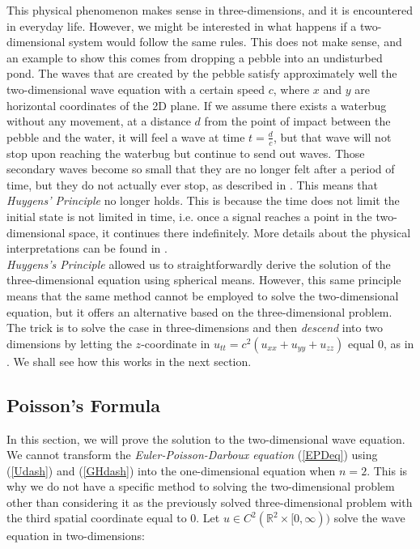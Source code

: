 \documentclass[a4paper, 12pt]{article}
\numberwithin{equation}{section}
\begin{document}
This physical phenomenon makes sense in three-dimensions, and it is encountered
in everyday life. However, we might be interested in what happens if a
two-dimensional system would follow the same rules. This does not make sense,
and an example to show this comes from dropping a pebble into an undisturbed
pond. The waves that are created by the pebble satisfy approximately well the
two-dimensional wave equation with a certain speed $c$, where $x$ and $y$ are
horizontal coordinates of the 2D plane. If we assume there exists a waterbug
without any movement, at a distance $d$ from the point of impact between the
pebble and the water, it will feel a wave at time $t=\frac{d}{c}$, but that wave
will not stop upon reaching the waterbug but continue to send out waves. Those
secondary waves become so small that they are no longer felt after a period of
time, but they do not actually ever stop, as described in \cite[Ch. 9.2]{Str}. This means
that \emph{Huygens' Principle} no longer holds. This is because the time does
not limit the initial state is not limited in time, i.e. once a signal reaches a
point in the two-dimensional space, it continues there indefinitely. More
details about the physical interpretations can be found in \cite[Ch.
III, \S 4.6]{Hil}. \\

\emph{Huygens's Principle} allowed us to straightforwardly derive the solution
of the three-dimensional equation using spherical means. However, this same
principle means that the same method cannot be employed to solve the
two-dimensional equation, but it offers an alternative based on the
three-dimensional problem. The trick is to solve the case in three-dimensions
and then \emph{descend} into two dimensions by letting the $z$-coordinate in
$u_{tt}=c^2(u_{xx}+u_{yy}+u_{zz})$ equal $0$, as in \cite[Ch. 2.4.1.c]{Ev}. We shall see how
this works in the next section. 

\subsection{Poisson's Formula}

In this section, we will prove the solution to the two-dimensional wave
equation. We cannot transform the \emph{Euler-Poisson-Darboux equation}
(\ref{EPDeq}) using (\ref{Udash}) and (\ref{GHdash}) into the one-dimensional
equation when $n=2$. This is why we do not have a specific method to solving the
two-dimensional problem other than considering it as the previously solved
three-dimensional problem with the third spatial coordinate equal to $0$. Let $u
\in C^2(\mathbb{R}^2 \times [0, \infty))$ solve the wave equation in
two-dimensions:
\end{document}
